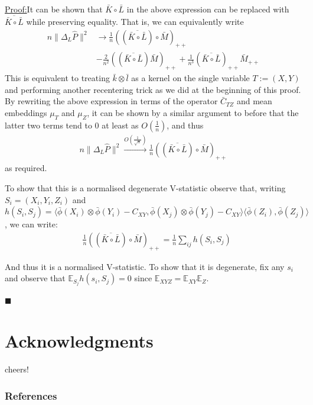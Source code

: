 \documentclass[]{article}
\newenvironment{claimproof}[1]{\par\noindent\underline{Proof:}\space#1}{\hfill $\blacksquare$}
\begin{document}
\begin{claimproof}
It can be shown that $\bar{K}\circ \bar{L}$ in the above expression can be replaced with $\overline{\bar{K}\circ \bar{L}}$ while preserving equality. That is, we can equivalently write
\begin{align*}
n\|\Delta_L \hat{P}\|^2 & \longrightarrow \frac{1}{n}((\overline{\bar{K}\circ \bar{L}}) \circ \bar{M})_{++}\\& - \frac{2}{n^2}((\overline{\bar{K}\circ \bar{L}})\bar{M})_{++} + \frac{1}{n^3}(\overline{\bar{K}\circ \bar{L}})_{++}\bar{M}_{++}
\end{align*}
This is equivalent to treating $\bar{k}\otimes\bar{l}$ as a kernel on the single variable $T:=(X,Y)$ and performing another recentering trick as we did at the beginning of this proof. By rewriting the above expression in terms of the operator $\bar{C}_{TZ}$ and mean embeddings $\mu_T$ and $\mu_Z$, it can be shown by a similar argument to before that the latter two terms tend to 0 at least as $O(\frac{1}{n})$, and thus  
\begin{align*}
n\|\Delta_L \hat{P}\|^2 \xrightarrow{O(\frac{1}{\sqrt{n}})} \frac{1}{n}((\overline{\bar{K}\circ \bar{L}}) \circ \bar{M})_{++}
\end{align*} as required.

To show that this is a normalised degenerate V-statistic observe that, writing $S_i=(X_i,Y_i,Z_i)$ and $h(S_i,S_j) = \langle\bar{\phi}(X_i)\otimes\bar{\phi}(Y_i) - C_{XY},\bar{\phi}(X_j)\otimes\bar{\phi}(Y_j) - C_{XY}\rangle\langle\bar{\phi}(Z_i),\bar{\phi}(Z_j)\rangle$, we can write:
\begin{align*}
&\frac{1}{n}((\overline{\bar{K}\circ \bar{L}}) \circ \bar{M})_{++}= \frac{1}{n}\sum_{ij} h(S_i,S_j)
\end{align*}

And thus it is a normalised V-statistic. To show that it is degenerate, fix any $s_i$ and observe that $\mathbb{E}_{S_j}h(s_i,S_j)=0$ since $\mathbb{E}_{XYZ} =\mathbb{E}_{XY}\mathbb{E}_{Z}$.

\end{claimproof}



\section*{Acknowledgments} 
cheers!

\subsubsection*{References}
\end{document}
